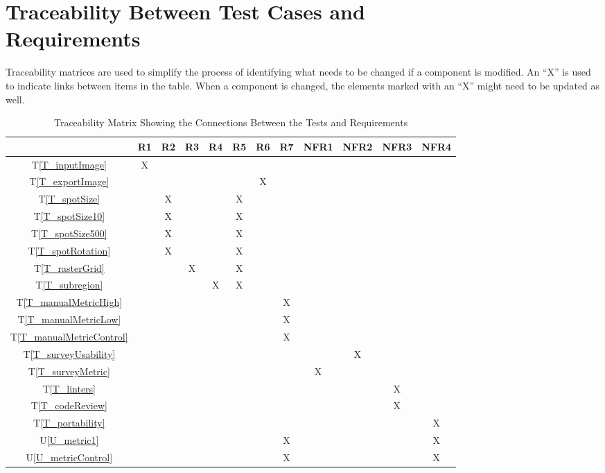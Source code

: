 \documentclass[12pt, titlepage]{article}
\newcommand{\tref}[1]{T\ref{#1}}
\newcommand{\utref}[1]{U\ref{#1}}
\begin{document}
\section{Traceability Between Test Cases and \\ Requirements}
Traceability matrices are used to simplify the process of identifying what needs to be changed 
if a component is modified. An ``X'' is used to indicate links between items in the table. 
When a component is changed, the elements marked with an ``X'' might need to be updated as well.

\begin{table}[h!]
  \centering
  \begin{tabular}{|c|c|c|c|c|c|c|c|c|c|c|c|}
  \hline
    & R1
    & R2
    & R3
    & R4
    & R5
    & R6
    & R7
    & NFR1
    & NFR2
    & NFR3
    & NFR4
  \\ \hline
  \tref{T_inputImage}           &X& & & & & & & & & & \\ \hline
  \tref{T_exportImage}          & & & & & &X& & & & & \\ \hline
  \tref{T_spotSize}             & &X& & &X& & & & & & \\ \hline
  \tref{T_spotSize10}           & &X& & &X& & & & & & \\ \hline
  \tref{T_spotSize500}          & &X& & &X& & & & & & \\ \hline
  \tref{T_spotRotation}         & &X& & &X& & & & & & \\ \hline
  \tref{T_rasterGrid}           & & &X& &X& & & & & & \\ \hline
  \tref{T_subregion}            & & & &X&X& & & & & & \\ \hline
  \tref{T_manualMetricHigh}     & & & & & & &X& & & & \\ \hline
  \tref{T_manualMetricLow}      & & & & & & &X& & & & \\ \hline
  \tref{T_manualMetricControl}  & & & & & & &X& & & & \\ \hline
  \tref{T_surveyUsability}      & & & & & & & & &X& & \\ \hline
  \tref{T_surveyMetric}         & & & & & & & &X& & & \\ \hline
  \tref{T_linters}              & & & & & & & & & &X& \\ \hline
  \tref{T_codeReview}           & & & & & & & & & &X& \\ \hline
  \tref{T_portability}          & & & & & & & & & & &X\\ \hline
  \utref{U_metric1}             & & & & & & &X& & & &X\\ \hline
  \utref{U_metricControl}       & & & & & & &X& & & &X\\ \hline
  \end{tabular}
  \caption{Traceability Matrix Showing the Connections Between the Tests and Requirements}
  \label{Table:A_trace}
\end{table}
\end{document}
